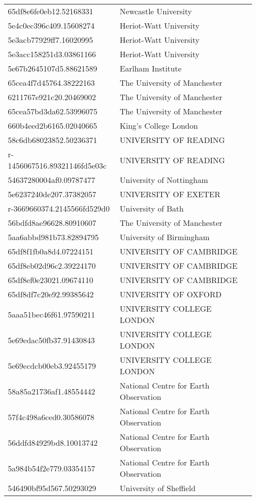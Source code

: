 \begin{tabular}{ll}
65df8e6fe0eb12.52168331 & Newcastle University \\
5e4c0ec396c409.15608274 & Heriot-Watt University \\
5e3acb77929ff7.16020995 & Heriot-Watt University \\
5e3acc158251d3.03861166 & Heriot-Watt University \\
5e67b2645107d5.88621589 & Earlham Institute \\
65cea4f7d45764.38222163 & The University of Manchester \\
6211767e921c20.20469002 & The University of Manchester \\
65cea57bd3da62.53996075 & The University of Manchester \\
660b4eed2b6165.02040665 & King's College London \\
58c6db68023852.50236371 & UNIVERSITY OF READING \\
r-1456067516.89321146fd5e03c & UNIVERSITY OF READING \\
54637280004af0.09787477 & University of Nottingham \\
5e6237240de207.37382057 & UNIVERSITY OF EXETER \\
r-3669660374.2145566fd529d0 & University of Bath \\
56bdfd8ae96628.80910607 & The University of Manchester \\
5aa6abbd981b73.82894795 & University of Birmingham \\
65df8f1fb0a8d4.07224151 & UNIVERSITY OF CAMBRIDGE \\
65df8eb02d96c2.39224170 & UNIVERSITY OF CAMBRIDGE \\
65df8ef0e23021.09674110 & UNIVERSITY OF CAMBRIDGE \\
65df8df7c20e92.99385642 & UNIVERSITY OF OXFORD \\
5aaa51bec46f61.97590211 & UNIVERSITY COLLEGE LONDON \\
5e69edac50fb37.91430843 & UNIVERSITY COLLEGE LONDON \\
5e69ecdcb00eb3.92455179 & UNIVERSITY COLLEGE LONDON \\
58a85a21736af1.48554442 & National Centre for Earth Observation \\
57f4c498a6ced0.30586078 & National Centre for Earth Observation \\
56ddfd84929bd8.10013742 & National Centre for Earth Observation \\
5a984b54f2e779.03354157 & National Centre for Earth Observation \\
546490bf95d567.50293029 & University of Sheffield \\

\end{tabular}
